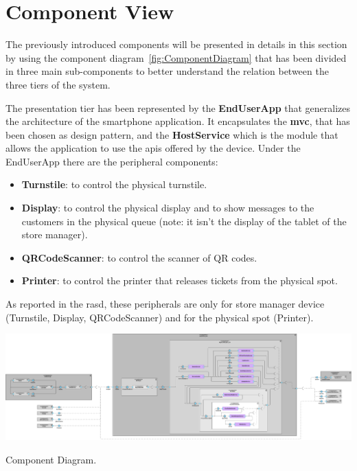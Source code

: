 \section{Component View}

The previously introduced components will be presented in details in this section by using the component diagram~\ref{fig:ComponentDiagram} that has been divided in three main sub-components to better understand the relation between the three tiers of the system.

The presentation tier has been represented by the \textbf{EndUserApp} that generalizes the architecture of the smartphone application.
It encapsulates the \textbf{\gls{mvc}}, that has been chosen as design pattern, and the \textbf{HostService} which is the module that allows the application to use the \glspl{api} offered by the device.
Under the EndUserApp there are the peripheral components:
\begin{itemize}
	\item \textbf{Turnstile}: to control the physical turnstile.
	\item \textbf{Display}: to control the physical display  and to show messages to the customers in the physical queue (note: it isn't the display of the tablet of the store manager).
	\item \textbf{QRCodeScanner}: to control the scanner of QR codes.
	\item \textbf{Printer}: to control the printer that releases tickets from the physical spot.
\end{itemize}
As reported in the \gls{rasd}, these peripherals are only for store manager device (Turnstile, Display, QRCodeScanner) and for the physical spot (Printer).

\begin{table} %
    \centering
    \includegraphics[width=1.0\textwidth]{images/component_diagram.pdf}
    \caption{Component Diagram.}\label{fig:ComponentDiagram}
\end{table} %


